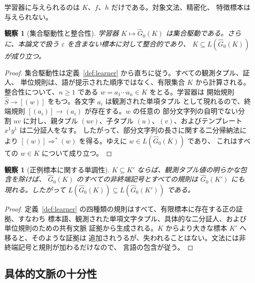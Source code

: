 \documentclass[11pt,a4paper]{ltjsarticle}
\newtheorem{observation}[theorem]{観察}
\theoremstyle{remark}
\newcommand{\eps}{\varepsilon}
\begin{document}
学習器に与えられるのは \(K\)、\(f\)、\(h\) だけである。対象文法、精密化、
特徴標本は与えられない。

\begin{observation}[集合駆動性と整合性]
\label{obs:set-driven-consistent}
学習器 \(K\mapsto\widehat G_0(K)\) は集合駆動である。さらに、本論文で扱う
\(\eps\) を含まない標本に対して整合的であり、
\(K\subseteq L(\widehat G_0(K))\) が成り立つ。
\end{observation}

\begin{proof}
集合駆動性は定義~\ref{def:learner} から直ちに従う。すべての観測タプル、証人、
単位規則は、語が提示された順序ではなく、有限集合 \(K\) から計算される。
整合性について、\(n\ge1\) である \(w=a_1\cdots a_n\in K\) をとる。学習器は
開始規則 \(\widehat S\to[(w)]\) をもつ。各文字 \(a_i\) は観測された単項タプル
として現れるので、終端規則 \([(a_i)]\to(a_i)\) が存在する。\(w\) の任意の
部分文字列の自明でない分割 \(uv\) に対し、親タプル \((uv)\)、子タプル
\((u)\)、\((v)\)、およびテンプレート \(x^1y^1\) は二分証人をなす。
したがって、部分文字列の長さに関する二分帰納法により
\([(w)]\Rightarrow^*(w)\) を得る。ゆえに \(w\in L(\widehat G_0(K))\) であり、
これはすべての \(w\in K\) について成り立つ。
\end{proof}

\begin{observation}[正例標本に関する単調性]
\label{obs:learner-monotone}
\(K\subseteq K'\) ならば、観測タプル値の明らかな包含を除けば、
\(\widehat G_0(K)\) のすべての非終端記号とすべての規則は
\(\widehat G_0(K')\) にも現れる。したがって
\(L(\widehat G_0(K))\subseteq L(\widehat G_0(K'))\) である。
\end{observation}

\begin{proof}
定義~\ref{def:learner} の四種類の規則はすべて、有限標本に存在する正の証拠、すなわち
標本語、観測された単項文字タプル、具体的な二分証人、および単位規則のための共有文脈
証拠から生成される。\(K\) からより大きな標本 \(K'\) へ移ると、そのような証拠は
追加されうるが、失われることはない。文法には非終端記号と規則が加わるだけなので、
言語の包含が従う。
\end{proof}

\subsection{具体的文脈の十分性}
\end{document}
